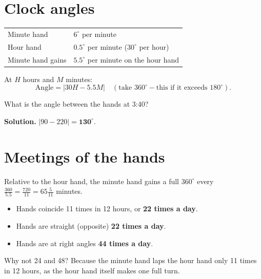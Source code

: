 \documentclass[11pt,a4paper,openany]{report}
\begin{document}
\section{Clock angles}
\begin{center}
\begin{tabular}{ll}
\toprule
Minute hand & $6^\circ$ per minute\\
Hour hand & $0.5^\circ$ per minute ($30^\circ$ per hour)\\
Minute hand gains & $5.5^\circ$ per minute on the hour hand\\
\bottomrule
\end{tabular}
\end{center}
At $H$ hours and $M$ minutes:
\[\text{Angle}=|30H-5.5M|\quad(\text{take }360^\circ-\text{this if it exceeds }180^\circ).\]
\begin{center}
\end{center}

\begin{example}
What is the angle between the hands at 3:40?

\textbf{Solution.} $|90-220|=\mathbf{130^\circ}$.
\end{example}

\section{Meetings of the hands}
Relative to the hour hand, the minute hand gains a full $360^\circ$ every $\frac{360}{5.5}=\frac{720}{11}=65\frac5{11}$ minutes.
\begin{itemize}[nosep]
\item Hands coincide 11 times in 12 hours, or \textbf{22 times a day}.
\item Hands are straight (opposite) \textbf{22 times a day}.
\item Hands are at right angles \textbf{44 times a day}.
\end{itemize}
Why not 24 and 48? Because the minute hand laps the hour hand only 11 times in 12 hours, as the hour hand itself makes one full turn.
\end{document}
